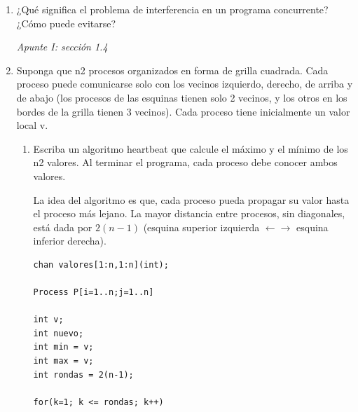 \documentclass[a4paper, 10pt]{article}
\newenvironment{QandA}{
    \begin{enumerate}\bfseries}
    {\end{enumerate}
}
\newenvironment{answered}{\par\normalfont}{}
\begin{document}
\begin{QandA}
\begin{enumerate}
\begin{answered}
El programa finalizará con \lstinline{aux = 19 o 21}.
\end{answered}
\item Si el valor de A = 0 y B = 0 antes del if, P3 envia el valor 9 y P2 el valor 5.
\begin{answered}
Las guardas 1 y 3, tienen éxito. Se elegirá una de las dos, de forma no deterministica y se ejecutará su sentencia guardada.
    
El programa finalizará con \lstinline{aux = 16 o 7}.
\end{answered}
\end{enumerate}

\item ¿Qué significa el problema de interferencia en un programa concurrente? ¿Cómo puede evitarse? 
\begin{answered}
\emph{Apunte I: sección 1.4}
\end{answered}



\item Suponga que n2 procesos organizados en forma de grilla cuadrada. Cada proceso puede comunicarse solo con los vecinos izquierdo, derecho, de arriba y de abajo (los procesos de las esquinas tienen solo 2 vecinos, y los otros en los bordes de la grilla tienen 3 vecinos). Cada proceso tiene inicialmente un valor local v.
\begin{enumerate}
\item Escriba un algoritmo heartbeat que calcule el máximo y el mínimo de los n2 valores. Al terminar el programa, cada proceso debe conocer ambos valores.
\begin{answered}
La idea del algoritmo es que, cada proceso pueda propagar su valor hasta el proceso más lejano. La mayor distancia entre procesos, sin diagonales, está dada por $2(n-1)$ (esquina superior izquierda $\leftarrow \rightarrow$ esquina inferior derecha).
\end{answered}

\begin{lstlisting}
chan valores[1:n,1:n](int);

Process P[i=1..n;j=1..n]

int v;
int nuevo;
int min = v;
int max = v;
int rondas = 2(n-1);

for(k=1; k <= rondas; k++)


\end{lstlisting}
\end{enumerate}
\end{QandA}
\end{document}
